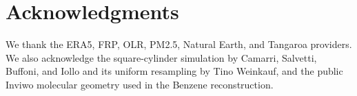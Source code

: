 \documentclass[review]{vgtc}                 %
\begin{document}
\maketitle
\raggedbottom
\setlength{\emergencystretch}{1em}








\FloatBarrier





\FloatBarrier



\FloatBarrier


\section*{Acknowledgments}
 We thank the ERA5, FRP, OLR, PM2.5, Natural Earth, and Tangaroa providers. We also acknowledge the square-cylinder simulation by Camarri, Salvetti, Buffoni, and Iollo and its uniform resampling by Tino Weinkauf, and the public Inviwo molecular geometry used in the Benzene reconstruction.
\begingroup
{}
\setlength{\bibspacing}{-0.3pt}


\endgroup
\end{document}
